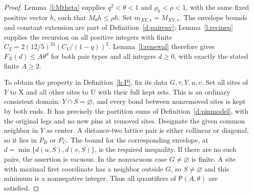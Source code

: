 \begin{proof}
Lemma~\ref{l:Mtheta} supplies \(q^2<\theta<1\) and
\(\rho_0<\rho<1\), with the same fixed positive vector \(h\),
such that \(M_\theta h\le\rho h\).  Set
\(m_{XY,s}=M_{XY,s}\).  The envelope bounds and constant
extension are part of Definition~\ref{d:pairenv};
Lemma~\ref{l:recineq} supplies the recursion on all positive
integers with finite
\(C_T=2(12/5)^{24}(C_V/(1-q))^2\).
Lemma~\ref{l:renewal} therefore gives
\(F_X(d)\le A\theta^d\) for both pair types and all integers
\(d\ge0\), with exactly the stated finite \(A\ge2\).

To obtain the property in Definition~\ref{h:P}, fix its data
\(G,\tau,Y,u,v\).  Set all sites of \(Y\) to \(\mathrm X\)
and all other sites to \(\mathrm U\) with their full kept sets.
This is an ordinary consistent domain: \(Y\cap S=\varnothing\),
and every bond between nonremoved sites is kept by both ends.
It has precisely the partition sums of
Definition~\ref{d:pinmodel}, with the original legs and no new
pins at removed sites.  Designate the given common neighbor in
\(Y\) as center.  A distance-two lattice pair is either collinear
or diagonal, so it lies in \(P_B\) or \(P_C\).
The bound for the corresponding envelope, at
\(d=\min\{d(u,S),d(v,S)\}\), is the required inequality.
If there are no such pairs, the assertion is vacuous.  In the
nonvacuous case \(G\ne\varnothing\) is finite.  A site with
maximal first coordinate has a neighbor outside \(G\), so
\(S\ne\varnothing\) and this minimum is a nonnegative integer.
Thus all quantifiers
of \(\mathsf P(A,\theta)\) are satisfied.
\end{proof}
